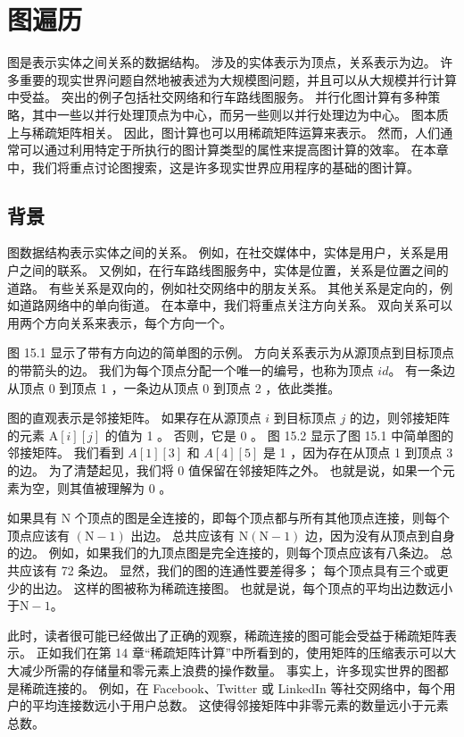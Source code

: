 \section{图遍历}
图是表示实体之间关系的数据结构。 涉及的实体表示为顶点，关系表示为边。 
许多重要的现实世界问题自然地被表述为大规模图问题，并且可以从大规模并行计算中受益。 突出的例子包括社交网络和行车路线图服务。 
并行化图计算有多种策略，其中一些以并行处理顶点为中心，而另一些则以并行处理边为中心。 图本质上与稀疏矩阵相关。 
因此，图计算也可以用稀疏矩阵运算来表示。 然而，人们通常可以通过利用特定于所执行的图计算类型的属性来提高图计算的效率。 
在本章中，我们将重点讨论图搜索，这是许多现实世界应用程序的基础的图计算。

\subsection{背景}
图数据结构表示实体之间的关系。 例如，在社交媒体中，实体是用户，关系是用户之间的联系。 
又例如，在行车路线图服务中，实体是位置，关系是位置之间的道路。 有些关系是双向的，例如社交网络中的朋友关系。 
其他关系是定向的，例如道路网络中的单向街道。 在本章中，我们将重点关注方向关系。 
双向关系可以用两个方向关系来表示，每个方向一个。

图 15.1 显示了带有方向边的简单图的示例。 方向关系表示为从源顶点到目标顶点的带箭头的边。 
我们为每个顶点分配一个唯一的编号，也称为顶点 $i d$。 有一条边从顶点 0 到顶点 1 ，一条边从顶点 0 到顶点 2 ，依此类推。

图的直观表示是邻接矩阵。 如果存在从源顶点 $i$ 到目标顶点 $j$ 的边，则邻接矩阵的元素 $\mathrm{A}[i][j]$ 的值为 1 。 
否则，它是 0 。 图 15.2 显示了图 15.1 中简单图的邻接矩阵。 
我们看到 $A[1][3]$ 和 $A[4][5]$ 是 1 ，因为存在从顶点 1 到顶点 3 的边。 为了清楚起见，我们将 0 值保留在邻接矩阵之外。 
也就是说，如果一个元素为空，则其值被理解为 0 。

如果具有 $\mathrm{N}$ 个顶点的图是全连接的，即每个顶点都与所有其他顶点连接，则每个顶点应该有 $(\mathrm{N}-1)$ 出边。 
总共应该有 $\mathrm{N}(\mathrm{N}-1)$ 边，因为没有从顶点到自身的边。 
例如，如果我们的九顶点图是完全连接的，则每个顶点应该有八条边。 总共应该有 72 条边。 
显然，我们的图的连通性要差得多； 每个顶点具有三个或更少的出边。 这样的图被称为稀疏连接图。 
也就是说，每个顶点的平均出边数远小于$\mathrm{N}-1$。

此时，读者很可能已经做出了正确的观察，稀疏连接的图可能会受益于稀疏矩阵表示。 
正如我们在第 14 章“稀疏矩阵计算”中所看到的，使用矩阵的压缩表示可以大大减少所需的存储量和零元素上浪费的操作数量。 
事实上，许多现实世界的图都是稀疏连接的。 
例如，在 Facebook、Twitter 或 LinkedIn 等社交网络中，每个用户的平均连接数远小于用户总数。 
这使得邻接矩阵中非零元素的数量远小于元素总数。

